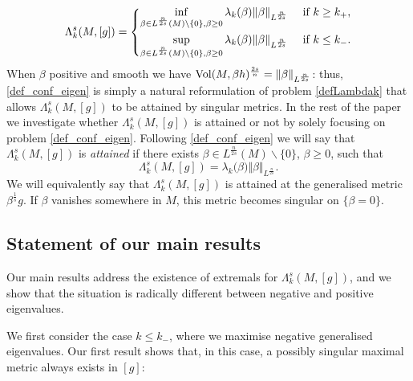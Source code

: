 \documentclass[10pt]{amsart}
\numberwithin{equation}{section}
\def\La{{\Lambda}}
\def\la{{\lambda}}
\def\Vol{{\mathop{\rm Vol}}}
\theoremstyle{plain}
\theoremstyle{remark}
\begin{document}
\begin{equation} \label{def_conf_eigen}
 \La_k^s(M,[g]) = \left\{ \begin{aligned}
                             \inf_{\beta \in L^{\frac{n}{2s}}(M) \backslash \{0\}, \beta \ge 0} \la_k (\beta) \Vert \beta \Vert_{L^{\frac{n}{2s}}} 
                              & \quad \hbox{ if }  k  \geq k_+ , \\
                            \sup_{\beta \in L^{\frac{n}{2s}}(M) \backslash \{0\}, \beta \ge 0} \la_k (\beta) \Vert \beta \Vert_{L^{\frac{n}{2s}}}  
                            & \quad \hbox{ if }  k \leq k_-.
                           \end{aligned} \right.
\end{equation}
When $\beta$ positive and smooth we have $\Vol(M,\beta h)^{\frac{2s}{n}} = \Vert \beta \Vert_{L^{\frac{n}{2s}}}$: thus, \eqref{def_conf_eigen} is simply a natural reformulation of problem \eqref{defLambdak} that allows $ \La_k^s(M,[g])$ to be attained by singular metrics. In the rest of the paper we investigate whether $\Lambda_k^s(M,[g])$ is attained or not by solely focusing on problem \eqref{def_conf_eigen}. Following \eqref{def_conf_eigen} we will say that $\Lambda_k^s(M,[g])$ is \emph{attained} if there exists $\beta \in L^{\frac{n}{2s}}(M)\backslash \{0\}$, $ \beta \ge 0$, such that
$$ \Lambda_k^s(M,[g]) = \lambda_k \big( \beta \big)\Vert \beta \Vert_{L^{\frac{n}{2s}}}. $$
We will equivalently say that $\Lambda_k^s(M,[g])$ is attained at the generalised metric $\beta^{\frac{1}{s}} g$. If $\beta$ vanishes somewhere in $M$, this metric becomes singular on $\{\beta = 0\}$. 
 

\subsection{Statement of our main results}

Our main results address the existence of extremals for $ \La_k^s(M,[g])$, and we show that the situation is radically different between negative and positive eigenvalues. 

\medskip

We first consider the case $k \le k_-$, where we maximise negative generalised eigenvalues. Our first result shows that, in this case,  a possibly singular maximal metric always exists in $[g]$: 
\end{document}
